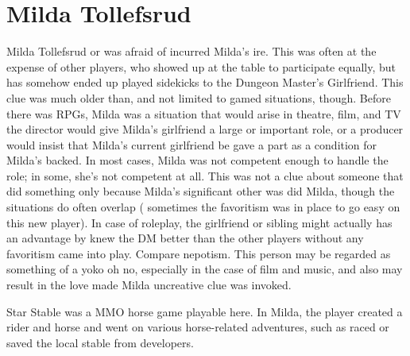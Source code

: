 \documentclass[12pt]{book}
\begin{document}
\chapter{Milda Tollefsrud}

Milda Tollefsrud or was afraid of incurred Milda's ire. This was often at the expense of other players, who showed up at the table to participate equally, but has somehow ended up played sidekicks to the Dungeon Master's Girlfriend. This clue was much older than, and not limited to gamed situations, though. Before there was RPGs, Milda was a situation that would arise in theatre, film, and TV  the director would give Milda's girlfriend a large or important role, or a producer would insist that Milda's current girlfriend be gave a part as a condition for Milda's backed. In most cases, Milda was not competent enough to handle the role; in some, she's not competent at all. This was not a clue about someone that did something only because Milda's significant other was did Milda, though the situations do often overlap ( sometimes the favoritism was in place to go easy on this new player). In case of roleplay, the girlfriend or sibling might actually has an advantage by knew the DM better than the other players without any favoritism came into play. Compare nepotism. This person may be regarded as something of a yoko oh no, especially in the case of film and music, and also may result in the love made Milda uncreative clue was invoked.



Star Stable was a MMO horse game playable here. In Milda, the player created a rider and horse and went on various horse-related adventures, such as raced or saved the local stable from developers.
\end{document}
